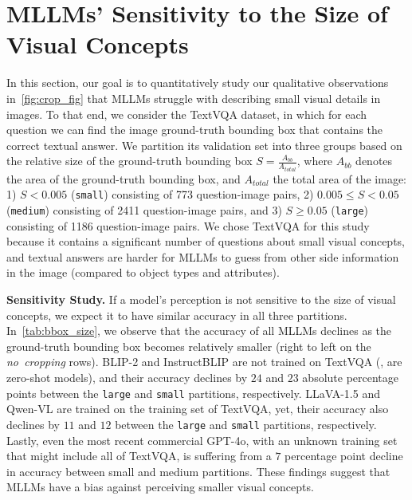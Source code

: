 \section{MLLMs' Sensitivity to the Size of Visual Concepts}



\label{sec:human_crop}
In this section, our goal is to quantitatively study our qualitative observations in~\cref{fig:crop_fig} that MLLMs struggle with describing small visual details in images. To that end, we consider the TextVQA dataset, in which for each question we can find the image ground-truth bounding box that contains the correct textual answer. We partition its validation set into three groups based on the relative size of the ground-truth bounding box $S = \frac{A_{bb}}{A_{total}}$, where $A_{bb}$ denotes the area of the ground-truth bounding box, and $A_{total}$ the total area of the image: 1) $S<0.005$ (\texttt{small}) consisting of 773 question-image pairs, 2) $0.005\leq S<0.05$ (\texttt{medium}) consisting of 2411 question-image pairs, and 3) $S\geq 0.05$ (\texttt{large}) consisting of 1186 question-image pairs. We chose TextVQA for this study because it contains a significant number of questions about small visual concepts, and textual answers are harder for MLLMs to guess from other side information in the image (compared to object types and attributes).

\textbf{Sensitivity Study.} If a model's perception is not sensitive to the size of visual concepts, we expect it to have similar accuracy in all three partitions.  In~\cref{tab:bbox_size}, we observe that the accuracy of all MLLMs declines as the ground-truth bounding box becomes relatively smaller (right to left on the \emph{no~cropping} rows). BLIP-2 and InstructBLIP are not trained on TextVQA (\ie, are zero-shot models), and their accuracy declines by $24$ and $23$ absolute percentage points between the \texttt{large} and \texttt{small} partitions, respectively. LLaVA-1.5 and Qwen-VL are trained on the training set of TextVQA, yet, their accuracy also declines by $11$ and $12$ between the \texttt{large} and \texttt{small} partitions, respectively. Lastly, even the most recent commercial GPT-4o, with an unknown training set that might include all of TextVQA, is suffering from a $7$ percentage point decline in accuracy between small and medium partitions. These findings suggest that MLLMs have a bias against perceiving smaller visual concepts.


